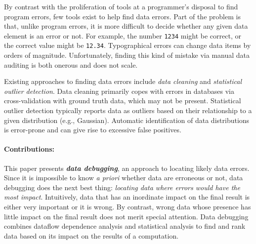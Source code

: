 


By contrast with the proliferation of tools at a programmer's disposal
to find program errors, few tools exist to help find data errors. Part
of the problem is that, unlike program errors, it is more difficult to
decide whether any given data element is an error or not. For example,
the number \texttt{1234} might be correct, or the
correct value might be \texttt{12.34}. Typographical errors 
can change data items by orders of magnitude. Unfortunately, finding this kind of mistake via manual data
auditing is both onerous and does not
scale.



Existing approaches to finding data errors include
\emph{data cleaning} and  \emph{statistical outlier detection}.
Data cleaning primarily copes with errors in databases via
cross-validation with ground truth data, which may not be
present. Statistical outlier detection typically reports data as
outliers based on their relationship to a given distribution (e.g.,
Gaussian).  Automatic identification of data distributions is
error-prone and can give rise to excessive false positives.



\paragraph{Contributions:}
This paper presents \emph{\bf data debugging}, an approach to locating
likely data errors. Since it is impossible to know \emph{a priori}
whether data are erroneous or not, data debugging does the next best
thing: \emph{locating data where errors would have the most
impact}. Intuitively, data that has an inordinate impact on the final
result is either very important or it is wrong. By contrast, wrong
data whose presence has little impact on the final result does not
merit special attention.  Data debugging combines dataflow dependence
analysis and statistical analysis to find and rank data based on its
impact on the results of a computation.

